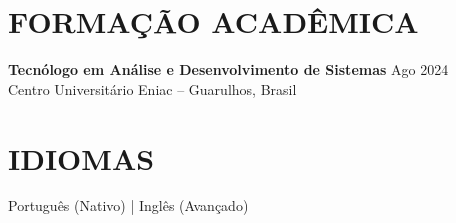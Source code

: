 \documentclass[10pt,letterpaper]{article}
\begin{document}
\section{FORMAÇÃO ACADÊMICA}
\textbf{Tecnólogo em Análise e Desenvolvimento de Sistemas} \hfill Ago 2024 \\
Centro Universitário Eniac -- Guarulhos, Brasil

\section{IDIOMAS}
Português (Nativo) \quad | \quad Inglês (Avançado)
\end{document}
